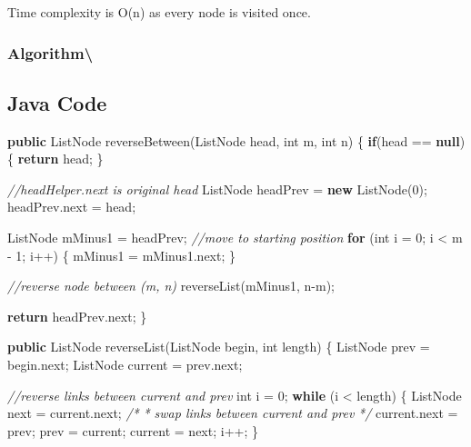 \documentclass[]{book}
\newenvironment{Shaded}{\begin{snugshade}}{\end{snugshade}}
\newcommand{\CommentTok}[1]{\textcolor[rgb]{0.56,0.35,0.01}{\textit{#1}}}
\newcommand{\DataTypeTok}[1]{\textcolor[rgb]{0.13,0.29,0.53}{#1}}
\newcommand{\DecValTok}[1]{\textcolor[rgb]{0.00,0.00,0.81}{#1}}
\newcommand{\FunctionTok}[1]{\textcolor[rgb]{0.00,0.00,0.00}{#1}}
\newcommand{\KeywordTok}[1]{\textcolor[rgb]{0.13,0.29,0.53}{\textbf{#1}}}
\newcommand{\NormalTok}[1]{#1}
\begin{document}
Time complexity is O(n) as every node is visited once.

\hypertarget{algorithm-116}{%
\subsubsection{Algorithm\textbackslash{}}\label{algorithm-116}}

\hypertarget{java-code-67}{%
\subsection{Java Code}\label{java-code-67}}

\begin{Shaded}
\begin{Highlighting}[]
\KeywordTok{public}\NormalTok{ ListNode }\FunctionTok{reverseBetween}\NormalTok{(ListNode head, }\DataTypeTok{int}\NormalTok{ m, }\DataTypeTok{int}\NormalTok{ n) \{}
    \KeywordTok{if}\NormalTok{(head == }\KeywordTok{null}\NormalTok{) \{}
        \KeywordTok{return}\NormalTok{ head;}
\NormalTok{    \}}

    \CommentTok{//headHelper.next is original head}
\NormalTok{    ListNode headPrev = }\KeywordTok{new} \FunctionTok{ListNode}\NormalTok{(}\DecValTok{0}\NormalTok{);}
\NormalTok{    headPrev.}\FunctionTok{next}\NormalTok{ = head;}

\NormalTok{    ListNode mMinus1 = headPrev;}
    \CommentTok{//move to starting position}
    \KeywordTok{for}\NormalTok{ (}\DataTypeTok{int}\NormalTok{ i = }\DecValTok{0}\NormalTok{; i < m - }\DecValTok{1}\NormalTok{; i++) \{}
\NormalTok{        mMinus1 = mMinus1.}\FunctionTok{next}\NormalTok{;}
\NormalTok{    \}}

    \CommentTok{//reverse node between (m, n)}
    \FunctionTok{reverseList}\NormalTok{(mMinus1, n-m);}

    \KeywordTok{return}\NormalTok{ headPrev.}\FunctionTok{next}\NormalTok{;}
\NormalTok{\}}

\KeywordTok{public}\NormalTok{ ListNode }\FunctionTok{reverseList}\NormalTok{(ListNode begin, }\DataTypeTok{int}\NormalTok{ length) \{}
\NormalTok{    ListNode prev = begin.}\FunctionTok{next}\NormalTok{;}
\NormalTok{    ListNode current = prev.}\FunctionTok{next}\NormalTok{;}

    \CommentTok{//reverse links between current and prev}
    \DataTypeTok{int}\NormalTok{ i = }\DecValTok{0}\NormalTok{;}
    \KeywordTok{while}\NormalTok{ (i < length) \{}
\NormalTok{        ListNode next = current.}\FunctionTok{next}\NormalTok{;}
        \CommentTok{/*}
\CommentTok{        * swap links between current and prev}
\CommentTok{        */}
\NormalTok{        current.}\FunctionTok{next}\NormalTok{ = prev;}
\NormalTok{        prev = current;}
\NormalTok{        current = next;}
\NormalTok{        i++;}
\NormalTok{    \}}


\end{Highlighting}
\end{Shaded}
\end{document}
